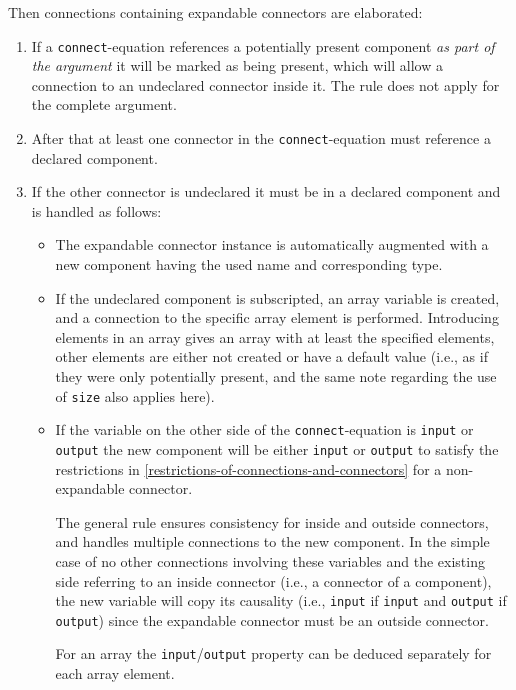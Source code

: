 Then connections containing expandable connectors are elaborated:
\begin{enumerate}
\item
  If a \lstinline!connect!-equation references a potentially present component \emph{as part of the argument} it will be marked as being present, which will allow a connection to an undeclared connector inside it.
  The rule does not apply for the complete argument.
\item
  After that at least one connector in the \lstinline!connect!-equation must reference a declared component.
\item
  If the other connector is undeclared it must be in a declared component and is handled as follows:
  \begin{itemize}
  \item
    The expandable connector instance is automatically augmented with a new component having the used name and corresponding type.
  \item
    If the undeclared component is subscripted, an array variable is created, and a connection to the specific array element is performed.
    Introducing elements in an array gives an array with at least the specified elements, other elements are either not created or have a default value (i.e., as if they were only potentially present, and the same note regarding the use of \lstinline!size! also applies here).
  \item
    If the variable on the other side of the \lstinline!connect!-equation is \lstinline!input! or \lstinline!output! the new component will be either \lstinline!input! or \lstinline!output! to satisfy the restrictions in \cref{restrictions-of-connections-and-connectors} for a non-expandable connector.
    \begin{nonnormative}
    The general rule ensures consistency for inside and outside connectors, and handles multiple connections to the new component.
    In the simple case of no other connections involving these variables and the existing side referring to an inside connector (i.e., a connector of a component), the new variable will copy its causality (i.e., \lstinline!input! if \lstinline!input! and \lstinline!output! if \lstinline!output!) since the expandable connector must be an outside connector.
    \end{nonnormative}
    For an array the \lstinline!input!/\lstinline!output! property can be deduced separately for each array element.
  \end{itemize}
\end{enumerate}

